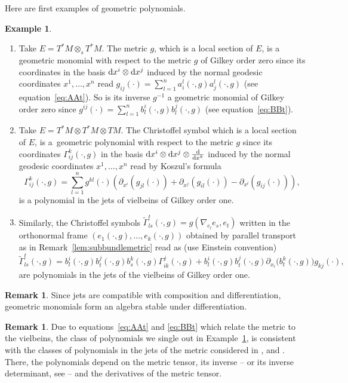 \documentclass[pdftex]{sigma}
\numberwithin{equation}{section}
\theoremstyle{definition}
\newtheorem{rk}[thm]{Remark}
\newtheorem{ex}[thm]{Example}
\begin{document}
Here are first examples of geometric polynomials.
\begin{ex}\label{ex:geompolTM}\quad
\begin{enumerate}\itemsep=0pt
\item Take $E=T^*M\otimes_s T^*M$. The metric $g$, which is a local section of $E$, is a geometric monomial with respect to the metric $g$ of Gilkey order zero since its coordinates in the basis ${\rm d}x^i \otimes {\rm d}x^j$ induced by the normal geodesic coordinates $x^1, \dots, x^n$ read
$g_{ij}(\cdot)=	\sum_{l=1}^n a_i^l(\cdot, g)a_j^l(\cdot, g)$ (see equation~\eqref{eq:AAt}). So is its inverse $g^{-1}$ a geometric monomial of Gilkey order zero since
$ g^{ij}(\cdot)=\sum_{l=1}^n b_l^i(\cdot,g) b_l^j(\cdot,g)$ (see equation~\eqref{eq:BBt}).
\item Take $E= T^*M\otimes T^*M \otimes TM$. The Christoffel symbol which is a local section of $E$, is a~geometric polynomial with respect to the metric $g$ since its coordinates $\Gamma_{ij}^k(\cdot,g)$ in the basis ${\rm d}x^i \otimes {\rm d}x^j\otimes \frac{{\rm d}}{{\rm d}x^k}$ induced by the normal geodesic coordinates $x^1, \dots, x^n$ read by Koszul's formula
\begin{equation}\label{eq:Koszul}\Gamma_{i j}^k(\cdot,g)=\sum_{l=1}^n g^{k l}(\cdot)\left(\partial_{x^i}(g_{jl}(\cdot))+\partial_{x^j}(g_{il}(\cdot))-\partial_{x^l}(g_{i j}(\cdot))\right),
\end{equation}
is a polynomial in the jets of vielbeins of Gilkey order one.
	
\item Similarly, the Christoffel symbols $\tilde\Gamma_{ls}^t(\cdot,g)=g(\nabla_{e_l}e_s,e_t)$ written in the orthonormal frame $(e_1(\cdot, g), \dots, e_k(\cdot, g))$ obtained by parallel transport as in Remark~\ref{lem:subbundlemetric} read as (use Einstein convention)
\begin{equation}\label{eq:relationschristofellsymbols}
\tilde\Gamma_{l s}^t (\cdot, g)=b_l^i(\cdot, g) b_t^j(\cdot, g) b_s^k(\cdot, g) \Gamma_{i k}^j (\cdot, g)+ b_l^i(\cdot, g) b_t^j(\cdot, g) \partial_{x_i}\bigl(b_t^k(\cdot, g)\bigr) g_{k j}(\cdot),
\end{equation}
are polynomials in the jets of the vielbeins of Gilkey order one.
\end{enumerate}
\end{ex}

\begin{rk}
Since jets are compatible with composition and differentiation, geometric monomials form an algebra stable under differentiation.
\end{rk}
\begin{rk}
	Due to equations~\eqref{eq:AAt} and \eqref{eq:BBt} which relate the metric to the vielbeins, the class of polynomials we single out in Example~\ref{ex:geompolTM},
	is consistent with the classes of polynomials in the jets of the metric considered in \cite{ABP}, \cite[Theorem 1.2]{E} and \cite[equation~(2.4.3)]{G}. There, the polynomials depend on the metric tensor, its inverse -- or its inverse determinant, see \cite[formula, item~1, p.~282]{ABP} -- and the derivatives of the metric tensor.
\end{rk}
\end{document}
